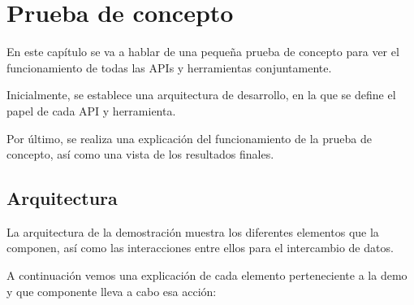 \chapter{Prueba de concepto}

En este capítulo se va a hablar de una pequeña prueba de concepto para ver el funcionamiento de todas las APIs y herramientas conjuntamente.

Inicialmente, se establece una arquitectura de desarrollo, en la que se define el papel de cada API y herramienta.

Por último, se realiza una explicación del funcionamiento de la prueba de concepto, así como una vista de los resultados finales.


\section{Arquitectura}
\label{sec:arquitectura}

La arquitectura de la demostración muestra los diferentes elementos que la componen, así como las interacciones entre ellos para el intercambio de datos.

A continuación vemos una explicación de cada elemento perteneciente a la demo y que componente lleva a cabo esa acción:

